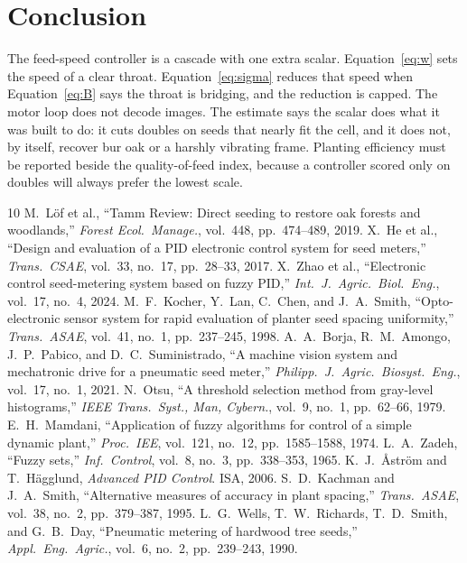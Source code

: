 \documentclass[11pt,a4paper]{article}
\begin{document}
\section{Conclusion}

The feed-speed controller is a cascade with one extra scalar. Equation~\eqref{eq:w} sets the speed of a clear throat. Equation~\eqref{eq:sigma} reduces that speed when Equation~\eqref{eq:B} says the throat is bridging, and the reduction is capped. The motor loop does not decode images. The estimate says the scalar does what it was built to do: it cuts doubles on seeds that nearly fit the cell, and it does not, by itself, recover bur oak or a harshly vibrating frame. Planting efficiency must be reported beside the quality-of-feed index, because a controller scored only on doubles will always prefer the lowest scale.

\begin{thebibliography}{10}
 M.~L\"of et al., ``Tamm Review: Direct seeding to restore oak forests and woodlands,'' \emph{Forest Ecol.\ Manage.}, vol.~448, pp.~474--489, 2019.
 X.~He et al., ``Design and evaluation of a PID electronic control system for seed meters,'' \emph{Trans.\ CSAE}, vol.~33, no.~17, pp.~28--33, 2017.
 X.~Zhao et al., ``Electronic control seed-metering system based on fuzzy PID,'' \emph{Int.\ J.\ Agric.\ Biol.\ Eng.}, vol.~17, no.~4, 2024.
 M.~F.~Kocher, Y.~Lan, C.~Chen, and J.~A.~Smith, ``Opto-electronic sensor system for rapid evaluation of planter seed spacing uniformity,'' \emph{Trans.\ ASAE}, vol.~41, no.~1, pp.~237--245, 1998.
 A.~A.~Borja, R.~M.~Amongo, J.~P.~Pabico, and D.~C.~Suministrado, ``A machine vision system and mechatronic drive for a pneumatic seed meter,'' \emph{Philipp.\ J.\ Agric.\ Biosyst.\ Eng.}, vol.~17, no.~1, 2021.
 N.~Otsu, ``A threshold selection method from gray-level histograms,'' \emph{IEEE Trans.\ Syst., Man, Cybern.}, vol.~9, no.~1, pp.~62--66, 1979.
 E.~H.~Mamdani, ``Application of fuzzy algorithms for control of a simple dynamic plant,'' \emph{Proc.\ IEE}, vol.~121, no.~12, pp.~1585--1588, 1974.
 L.~A.~Zadeh, ``Fuzzy sets,'' \emph{Inf.\ Control}, vol.~8, no.~3, pp.~338--353, 1965.
 K.~J.~{\AA}str\"om and T.~H\"agglund, \emph{Advanced PID Control}. ISA, 2006.
 S.~D.~Kachman and J.~A.~Smith, ``Alternative measures of accuracy in plant spacing,'' \emph{Trans.\ ASAE}, vol.~38, no.~2, pp.~379--387, 1995.
 L.~G.~Wells, T.~W.~Richards, T.~D.~Smith, and G.~B.~Day, ``Pneumatic metering of hardwood tree seeds,'' \emph{Appl.\ Eng.\ Agric.}, vol.~6, no.~2, pp.~239--243, 1990.
\end{thebibliography}
\end{document}
